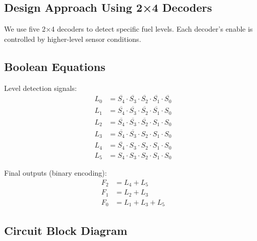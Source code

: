 \documentclass[12pt,a4paper]{article}
\begin{document}
\subsection{Design Approach Using 2×4 Decoders}

\begin{conceptbox}
We use five 2×4 decoders to detect specific fuel levels. Each decoder's enable is controlled by higher-level sensor conditions.
\end{conceptbox}

\subsection{Boolean Equations}

Level detection signals:
\begin{align}
L_0 &= \overline{S_4} \cdot \overline{S_3} \cdot \overline{S_2} \cdot \overline{S_1} \cdot \overline{S_0} \\
L_1 &= \overline{S_4} \cdot \overline{S_3} \cdot \overline{S_2} \cdot \overline{S_1} \cdot S_0 \\
L_2 &= \overline{S_4} \cdot \overline{S_3} \cdot \overline{S_2} \cdot S_1 \cdot S_0 \\
L_3 &= \overline{S_4} \cdot \overline{S_3} \cdot S_2 \cdot S_1 \cdot S_0 \\
L_4 &= \overline{S_4} \cdot S_3 \cdot S_2 \cdot S_1 \cdot S_0 \\
L_5 &= S_4 \cdot S_3 \cdot S_2 \cdot S_1 \cdot S_0
\end{align}

Final outputs (binary encoding):
\begin{align}
F_2 &= L_4 + L_5 \\
F_1 &= L_2 + L_3 \\
F_0 &= L_1 + L_3 + L_5
\end{align}

\subsection{Circuit Block Diagram}
\end{document}
